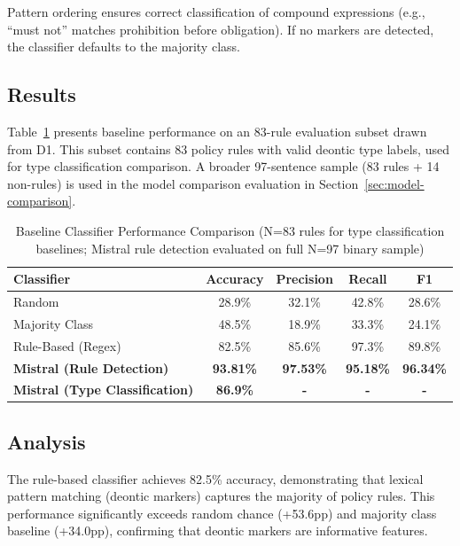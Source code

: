Pattern ordering ensures correct classification of compound expressions (e.g., ``must not'' matches prohibition before obligation). If no markers are detected, the classifier defaults to the majority class.

\subsection{Results}

Table~\ref{tab:baseline-comparison} presents baseline performance on an 83-rule evaluation subset drawn from D1. This subset contains 83 policy rules with valid deontic type labels, used for type classification comparison. A broader 97-sentence sample (83 rules + 14 non-rules) is used in the model comparison evaluation in Section~\ref{sec:model-comparison}.

\begin{table}[htbp]
\centering
\caption{Baseline Classifier Performance Comparison (N=83 rules for type classification baselines; Mistral rule detection evaluated on full N=97 binary sample)}
\label{tab:baseline-comparison}
\begin{tabular}{lcccc}
\toprule
\textbf{Classifier} & \textbf{Accuracy} & \textbf{Precision} & \textbf{Recall} & \textbf{F1} \\
\midrule
Random              & 28.9\% & 32.1\% & 42.8\% & 28.6\% \\
Majority Class      & 48.5\% & 18.9\% & 33.3\% & 24.1\% \\
Rule-Based (Regex)  & 82.5\% & 85.6\% & 97.3\% & 89.8\% \\
\midrule
\textbf{Mistral (Rule Detection)} & \textbf{93.81\%} & \textbf{97.53\%} & \textbf{95.18\%} & \textbf{96.34\%} \\
\textbf{Mistral (Type Classification)} & \textbf{86.9\%} & \textbf{-} & \textbf{-} & \textbf{-} \\
\bottomrule
\end{tabular}
\end{table}

\subsection{Analysis}

The rule-based classifier achieves 82.5\% accuracy, demonstrating that lexical pattern matching (deontic markers) captures the majority of policy rules. This performance significantly exceeds random chance (+53.6pp) and majority class baseline (+34.0pp), confirming that deontic markers are informative features.

